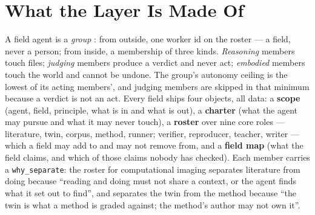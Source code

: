 \section{What the Layer Is Made Of}\label{sec:made}

A field agent is a \emph{group} \citep{yang2026library}: from outside, one worker id on the roster --- a field, never a person; from inside, a membership of three kinds. \emph{Reasoning} members touch files; \emph{judging} members produce a verdict and never act; \emph{embodied} members touch the world and cannot be undone. The group's autonomy ceiling is the lowest of its acting members', and judging members are skipped in that minimum because a verdict is not an act. Every field ships four objects, all data: a \textbf{scope} (agent, field, principle, what is in and what is out), a \textbf{charter} (what the agent may pursue and what it may never touch), a \textbf{roster} over nine core roles --- literature, twin, corpus, method, runner; verifier, reproducer, teacher, writer --- which a field may add to and may not remove from, and a \textbf{field map} (what the field claims, and which of those claims nobody has checked). Each member carries a \texttt{why\_separate}: the roster for computational imaging separates literature from doing because ``reading and doing must not share a context, or the agent finds what it set out to find'', and separates the twin from the method because ``the twin is what a method is graded against; the method's author may not own it''.

